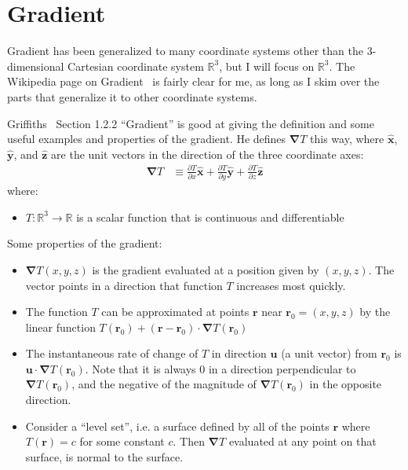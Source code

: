 \documentclass[a4paper]{article}
\theoremstyle{plain}
\theoremstyle{definition}
\newcommand{\vect}[1]{\textbf{#1}}
\newcommand{\hatvec}[1]{\hat{\textbf{#1}}}
\newcommand{\reals}{\mathbb{R}}
\newcommand{\del}{\bm{\nabla}}
\begin{document}
\section{Gradient}
\label{sec:gradient}

Gradient has been generalized to many coordinate systems other than
the 3-dimensional Cartesian coordinate system $\reals^3$, but I will
focus on $\reals^3$.  The Wikipedia page on Gradient~\cite{Gradient}
is fairly clear for me, as long as I skim over the parts that
generalize it to other coordinate systems.

Griffiths~\cite{Griffiths1998} Section 1.2.2 ``Gradient'' is good at
giving the definition and some useful examples and properties of the
gradient.  He defines $\del T$ this way, where $\hatvec{x}$,
$\hatvec{y}$, and $\hatvec{z}$ are the unit vectors in the direction
of the three coordinate axes:
\begin{align*}
  \del T & \equiv \frac{\partial T}{\partial x} \hatvec{x}
                + \frac{\partial T}{\partial y} \hatvec{y}
                + \frac{\partial T}{\partial z} \hatvec{z}
\end{align*}
where:
\begin{itemize}
  \item $T : \reals^3 \rightarrow \reals$ is a scalar function that is
    continuous and differentiable
\end{itemize}
Some properties of the gradient:
\begin{itemize}
  \item $\del T(x, y, z)$ is the gradient evaluated at a position
    given by $(x, y, z)$.  The vector points in a direction that
    function $T$ increases most quickly.
  \item The function $T$ can be approximated at points $\vect{r}$ near
    $\vect{r}_0 = (x, y, z)$ by the linear function $T(\vect{r}_0) +
    (\vect{r} - \vect{r}_0) \cdot \del T(\vect{r}_0)$
  \item The instantaneous rate of change of $T$ in direction
    $\vect{u}$ (a unit vector) from $\vect{r}_0$ is $\vect{u} \cdot
    \del T(\vect{r}_0)$.  Note that it is always 0 in a direction
    perpendicular to $\del T(\vect{r}_0)$, and the negative of the
    magnitude of $\del T(\vect{r}_0)$ in the opposite direction.
  \item Consider a ``level set'', i.e. a surface defined by all of the
    points $\vect{r}$ where $T(\vect{r})=c$ for some constant $c$.
    Then $\del T$ evaluated at any point on that surface, is normal
    to the surface.
\end{itemize}
\end{document}
